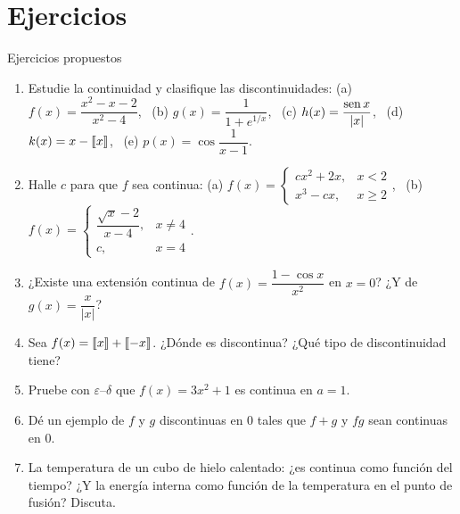 \documentclass[10pt,aspectratio=169]{beamer}
\begin{document}
\section{Ejercicios}

\begin{frame}{Ejercicios propuestos}
  \small
  \begin{ejercicio}
    \begin{enumerate}
      \item Estudie la continuidad y clasifique las discontinuidades: (a) $f(x)=\dfrac{x^2-x-2}{x^2-4}$, \ (b) $g(x)=\dfrac{1}{1+e^{1/x}}$,
        \ (c) $h(x)=\dfrac{\operatorname{sen} x}{|x|}$, \ (d) $k(x)=x-\left\llbracket x\right\rrbracket$, \ (e) $p(x)=\cos\dfrac{1}{x-1}$.
      \item Halle $c$ para que $f$ sea continua: (a) $f(x)=\begin{cases}cx^2+2x,&x<2\\ x^3-cx,&x\ge2\end{cases}$,
        \ (b) $f(x)=\begin{cases}\dfrac{\sqrt{x}-2}{x-4},&x\neq4\\ c,&x=4\end{cases}$.
      \item ¿Existe una extensión continua de $f(x)=\dfrac{1-\cos x}{x^2}$ en $x=0$? ¿Y de $g(x)=\dfrac{x}{|x|}$?
      \item Sea $f(x)=\left\llbracket x\right\rrbracket+\left\llbracket -x\right\rrbracket$. ¿Dónde es discontinua? ¿Qué tipo de discontinuidad tiene?
      \item Pruebe con $\varepsilon$--$\delta$ que $f(x)=3x^2+1$ es continua en $a=1$.
      \item Dé un ejemplo de $f$ y $g$ discontinuas en $0$ tales que $f+g$ y $fg$ sean continuas en $0$.
      \item La temperatura de un cubo de hielo calentado: ¿es continua como función del tiempo? ¿Y la energía interna como función de la temperatura en el punto de fusión? Discuta.
    \end{enumerate}
  \end{ejercicio}
\end{frame}
\end{document}
